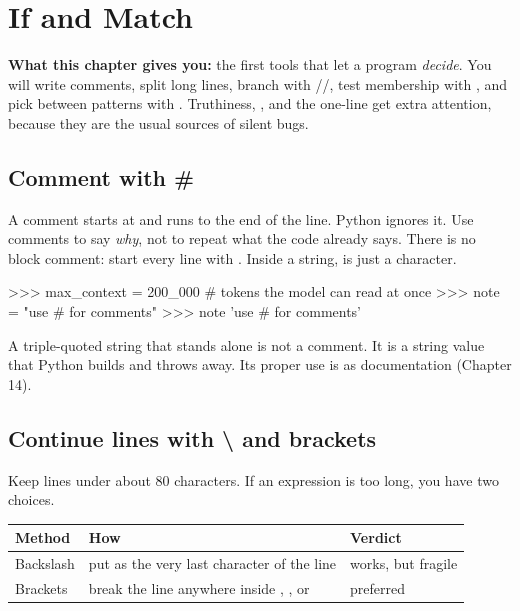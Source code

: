 \chapter{If and Match}

\textbf{What this chapter gives you:} the first tools that let a program \emph{decide}. You will write
comments, split long lines, branch with //, test membership with ,
and pick between patterns with . Truthiness, , and the one-line 
get extra attention, because they are the usual sources of silent bugs.


\section{Comment with \#}

A comment starts at \code{\#} and runs to the end of the line. Python ignores it. Use comments to say
\emph{why}, not to repeat what the code already says. There is no block comment: start every line with
\code{\#}. Inside a string, \code{\#} is just a character.

\begin{pycode}
>>> max_context = 200_000   # tokens the model can read at once
>>> note = "use # for comments"
>>> note
'use # for comments'
\end{pycode}

A triple-quoted string that stands alone is not a comment. It is a string value that Python builds and
throws away. Its proper use is as documentation (Chapter 14).

\section{Continue lines with \textbackslash{} and brackets}

Keep lines under about 80 characters. If an expression is too long, you have two choices.

\begin{center}
\begin{tabularx}{\linewidth}{@{}l X l@{}}
\toprule
\textbf{Method} & \textbf{How} & \textbf{Verdict} \\
\midrule
Backslash & put \code{\textbackslash} as the very last character of the line & works, but fragile \\
Brackets  & break the line anywhere inside \code{( )}, \code{[ ]}, or \code{\{ \}} & preferred \\
\bottomrule
\end{tabularx}
\end{center}

